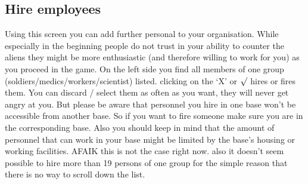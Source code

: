\subsection{Hire employees}
Using this screen you can add further personal to your organisation. While especially in the beginning people do not trust in your ability to counter the aliens they might be more enthusiastic (and therefore willing to work for you) as you proceed in the game. On the left side you find all members of one group (soldiers/medics/workers/scientist) listed. clicking on the `X' or $\surd$ hires or fires them. You can discard / select them as often as you want, they will never get angry at you. But please be aware that personnel you hire in one base won't be accessible from another base. So if you want to fire someone make sure you are in the corresponding base. Also you should keep in mind that the amount of personnel that can work in your base might be limited by the base's housing or working facilities. AFAIK this is not the case right now. also it doesn't seem possible to hire more than 19 persons of one group for the simple reason that there is no way to scroll down the list.

